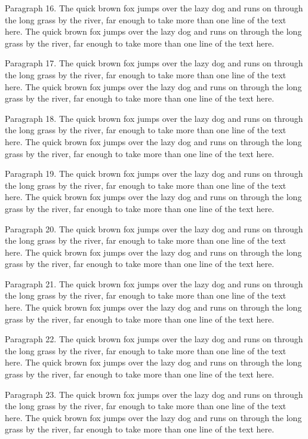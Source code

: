 \documentclass{article}
\begin{document}
Paragraph 16. The quick brown fox jumps over the lazy dog and runs on through the long grass by the river, far enough to take more than one line of the text here. The quick brown fox jumps over the lazy dog and runs on through the long grass by the river, far enough to take more than one line of the text here.

Paragraph 17. The quick brown fox jumps over the lazy dog and runs on through the long grass by the river, far enough to take more than one line of the text here. The quick brown fox jumps over the lazy dog and runs on through the long grass by the river, far enough to take more than one line of the text here.

Paragraph 18. The quick brown fox jumps over the lazy dog and runs on through the long grass by the river, far enough to take more than one line of the text here. The quick brown fox jumps over the lazy dog and runs on through the long grass by the river, far enough to take more than one line of the text here.

Paragraph 19. The quick brown fox jumps over the lazy dog and runs on through the long grass by the river, far enough to take more than one line of the text here. The quick brown fox jumps over the lazy dog and runs on through the long grass by the river, far enough to take more than one line of the text here.

Paragraph 20. The quick brown fox jumps over the lazy dog and runs on through the long grass by the river, far enough to take more than one line of the text here. The quick brown fox jumps over the lazy dog and runs on through the long grass by the river, far enough to take more than one line of the text here.

Paragraph 21. The quick brown fox jumps over the lazy dog and runs on through the long grass by the river, far enough to take more than one line of the text here. The quick brown fox jumps over the lazy dog and runs on through the long grass by the river, far enough to take more than one line of the text here.

Paragraph 22. The quick brown fox jumps over the lazy dog and runs on through the long grass by the river, far enough to take more than one line of the text here. The quick brown fox jumps over the lazy dog and runs on through the long grass by the river, far enough to take more than one line of the text here.

Paragraph 23. The quick brown fox jumps over the lazy dog and runs on through the long grass by the river, far enough to take more than one line of the text here. The quick brown fox jumps over the lazy dog and runs on through the long grass by the river, far enough to take more than one line of the text here.
\end{document}
